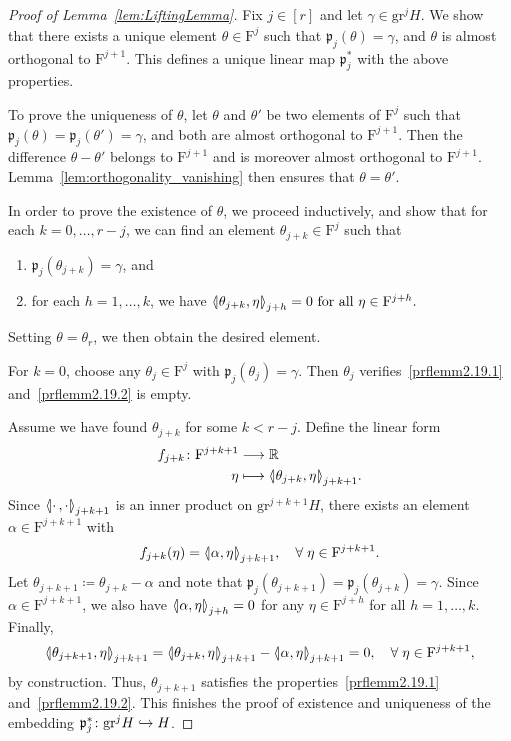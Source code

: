 \documentclass[AHL,Unicode,longabstracts]{cedram}
\newcommand{\llangle}{\mathopen{\langle\mkern -3.1mu\lvert}}
\newcommand{\rrangle}{\mathclose{\rvert\mkern -3.1mu\rangle}}
\newcommand{\highinn}[2]{{\llangle#2\rrangle_{#1}}}
\newcommand{\filter}{\mathrm{F}}
\newcommand{\R}{\mathbb{R}}
\newcommand{\grm}[2]{\mathrm{gr}_{#1}^{#2}}
\newcommand{\proj}{\mathfrak{p}}
\renewcommand*{\to}{\mathchoice{\longrightarrow}{\rightarrow}{\rightarrow}{\rightarrow}}
\newcommand{\longhookrightarrow}{\lhook\joinrel\longrightarrow}
\newcommand*{\hookto}{\mathchoice{\longhookrightarrow}{\hookrightarrow}{\hookrightarrow}{\hookrightarrow}}
\newcommand*{\relabel}{\renewcommand{\labelenumi}{(\theenumi)}}
\newcommand*{\romanenumi}{\renewcommand*{\theenumi}{\roman{enumi}}\relabel}
\let\oldforall\forall
\renewcommand*{\forall}{\mathrel{\oldforall}}
\begin{document}
\begin{proof}[Proof of Lemma~\ref{lem:LiftingLemma}]
Fix $j \in [r]$ and let $\gamma\in \grm{}{j}H$. We show that there exists a unique element $\theta \in \filter^j$ such that $\proj_j(\theta) =\gamma$, and $\theta$ is almost orthogonal to $\filter^{j+1}$. This defines a unique linear map $\proj_j^*$ with the above properties.

To prove the uniqueness of $\theta$, let $\theta$ and $\theta'$ be two elements of $\filter^j$ such that $\proj_j(\theta) =\proj_j(\theta') = \gamma$, and both are almost orthogonal to $\filter^{j+1}$. Then the difference $\theta-\theta'$ belongs to $\filter^{j+1}$ and is moreover almost orthogonal to $\filter^{j+1}$. Lemma~\ref{lem:orthogonality_vanishing} then ensures that $\theta =\theta'$.


In order to prove the existence of $\theta$, we proceed inductively, and show that for each $k=0, \dots, r-j$, we can find an element $\theta_{j+k}\in \filter^j$ such that
\begin{enumerate}\romanenumi
\item\label{prflemm2.19.1} $\proj_j(\theta_{j+k}) = \gamma$, and

\item\label{prflemm2.19.2} for each $h=1, \dots, k$, we have $\highinn{j+h}{\theta_{j+k}, \eta} = 0 \text{ for all }\eta\in \filter^{j+h}.$
\end{enumerate}
Setting $\theta = \theta_{r}$, we then obtain the desired element.

For $k=0$, choose any $\theta_j \in \filter^j$ with $\proj_j(\theta_j) =\gamma$. Then $\theta_j$ verifies~\eqref{prflemm2.19.1} and~\eqref{prflemm2.19.2} is empty.

Assume we have found $\theta_{j+k}$ for some $k< r-j$. Define the linear form
\begin{align*}
f_{j+k}\colon \filter^{j+k+1} &\to \R\\
\eta &\longmapsto \highinn{j+k+1}{\theta_{j+k}, \eta}.
\end{align*}
Since $\highinn{j+k+1}{\cdot \,, \cdot}$ is an inner product on $\grm{}{j+k+1}H$, there exists an element $\alpha \in \filter^{j+k+1}$ with
\[
f_{j+k}(\eta) = \highinn{j+k+1}{\alpha, \eta}, \quad \forall \eta\in \filter^{j+k+1}.
\]
Let $\theta_{j+k+1} \coloneqq \theta_{j+k} - \alpha$ and note that $\proj_j(\theta_{j+k+1}) = \proj_j(\theta_{j+k}) =\gamma$. Since $\alpha \in \filter^{j+k+1}$, we also have $\highinn{j+h}{\alpha, \eta}=0$ for any $\eta \in \filter^{j+h}$ for all $h=1, \dots, k$. Finally,
\[
\highinn{j+k+1}{\theta_{j+k+1}, \eta} = \highinn{j+k+1}{\theta_{j+k}, \eta} - \highinn{j+k+1}{\alpha, \eta}= 0, \quad \forall \eta\in \filter^{j+k+1},
\]
by construction. Thus, $\theta_{j+k+1}$ satisfies the properties~\eqref{prflemm2.19.1} and~\eqref{prflemm2.19.2}. This finishes the proof of existence and uniqueness of the embedding $\proj_j^* \colon \grm{}{j}H \hookto H$.


\end{proof}
\end{document}

